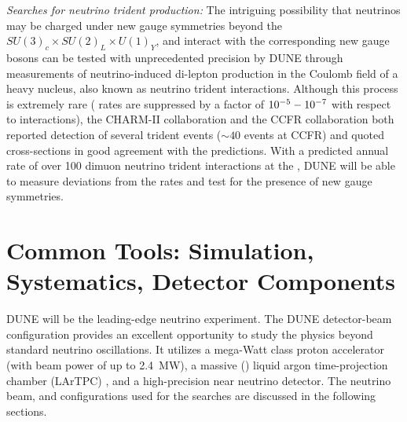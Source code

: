 \textit{Searches for neutrino trident production:} The intriguing possibility that neutrinos may be charged under new gauge symmetries beyond the   $SU(3)_{c} \times SU(2)_{L} \times U(1)_{Y}$, and interact with the corresponding new gauge bosons can be tested with unprecedented precision by DUNE through   measurements of neutrino-induced di-lepton production in the Coulomb field of a heavy nucleus, also known as neutrino trident interactions. Although this process is extremely rare ( rates are suppressed by a factor of $10^{-5} \-- 10^{-7}$ with respect to  interactions), the CHARM-II collaboration and the CCFR collaboration both reported detection of several trident events ($\sim40$ events at CCFR) and quoted cross-sections in good agreement with the  predictions. With a predicted annual rate of over 100 dimuon neutrino trident interactions at the  , DUNE will be able to measure deviations from the  rates and test for the presence of new gauge symmetries.


\section{Common Tools: Simulation, Systematics, Detector Components}
DUNE will be the leading-edge neutrino experiment. The DUNE detector-beam configuration  provides an excellent opportunity to study the physics beyond standard neutrino
oscillations. It utilizes a mega-Watt class proton accelerator (with beam power of up to \SI{2.4}{MW}), a massive (\fdfiducialmass) liquid argon time-projection chamber (LArTPC) , and a high-precision near neutrino detector. The neutrino beam,  and  configurations used for the  searches are %
discussed in the following sections.

